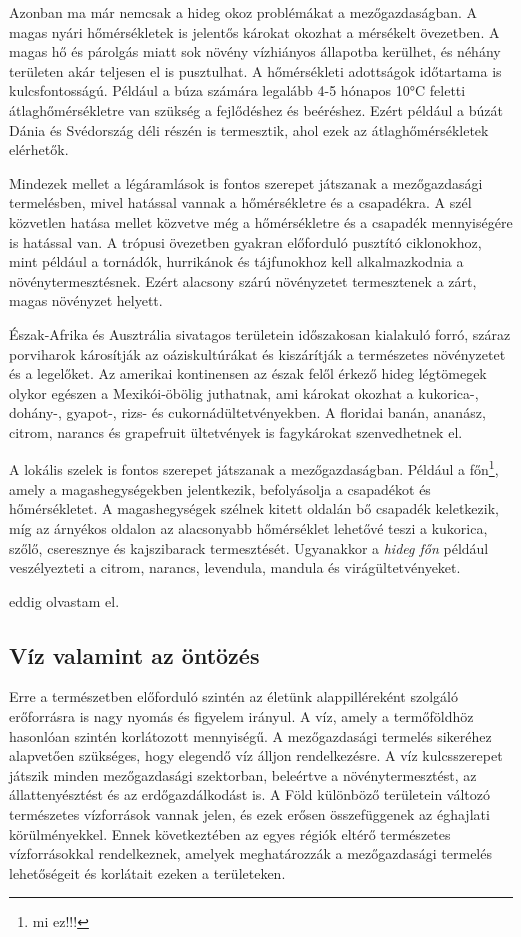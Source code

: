 \documentclass[a4paper,oneside,onecolumn,12pt]{LegrandOrangeBook}
\begin{document}
Azonban ma már nemcsak a hideg okoz problémákat a mezőgazdaságban. A magas nyári hőmérsékletek is jelentős károkat okozhat a mérsékelt övezetben. A magas hő és párolgás miatt sok növény vízhiányos állapotba kerülhet, és néhány területen akár teljesen el is pusztulhat. A hőmérsékleti adottságok időtartama is kulcsfontosságú. Például a búza számára legalább 4-5 hónapos 10°C feletti átlaghőmérsékletre van szükség a fejlődéshez és beéréshez. Ezért például a búzát Dánia és Svédország déli részén is termesztik, ahol ezek az átlaghőmérsékletek elérhetők. 

Mindezek mellet a légáramlások is fontos szerepet játszanak a mezőgazdasági termelésben, mivel hatással vannak a hőmérsékletre és a csapadékra. A szél közvetlen hatása mellet közvetve még a hőmérsékletre és a csapadék mennyiségére is hatással van. 
A trópusi övezetben gyakran előforduló pusztító ciklonokhoz, mint például a tornádók, hurrikánok és tájfunokhoz kell alkalmazkodnia a növénytermesztésnek. Ezért alacsony szárú növényzetet termesztenek a zárt, magas növényzet helyett.

Észak-Afrika és Ausztrália sivatagos területein időszakosan kialakuló forró, száraz porviharok károsítják az oáziskultúrákat és kiszárítják a természetes növényzetet és a legelőket.
Az amerikai kontinensen az észak felől érkező hideg légtömegek olykor egészen a Mexikói-öbölig juthatnak, ami károkat okozhat a kukorica-, dohány-, gyapot-, rizs- és cukornádültetvényekben. A floridai banán, ananász, citrom, narancs és grapefruit ültetvények is fagykárokat szenvedhetnek el.

A lokális szelek is fontos szerepet játszanak a mezőgazdaságban. Például a főn\footnote{mi ez!!!}, amely a magashegységekben jelentkezik, befolyásolja a csapadékot és hőmérsékletet. A magashegységek szélnek kitett oldalán bő csapadék keletkezik, míg az árnyékos oldalon az alacsonyabb hőmérséklet lehetővé teszi a kukorica, szőlő, cseresznye és kajszibarack termesztését. Ugyanakkor a {\it hideg főn} például veszélyezteti a citrom, narancs, levendula, mandula és virágültetvényeket.

eddig olvastam el.
\subsection{Víz valamint az öntözés}

	Erre a természetben előforduló szintén az életünk alappilléreként szolgáló erőforrásra is nagy nyomás és figyelem irányul. A víz, amely a termőföldhöz hasonlóan szintén korlátozott mennyiségű. 
	A mezőgazdasági termelés sikeréhez alapvetően szükséges, hogy elegendő víz álljon rendelkezésre. A víz kulcsszerepet játszik minden mezőgazdasági szektorban, beleértve a növénytermesztést, az állattenyésztést és az erdőgazdálkodást is. A Föld különböző területein változó természetes vízforrások vannak jelen, és ezek erősen összefüggenek az éghajlati körülményekkel. Ennek következtében az egyes régiók eltérő természetes vízforrásokkal rendelkeznek, amelyek meghatározzák a mezőgazdasági termelés lehetőségeit és korlátait ezeken a területeken.
\end{document}
